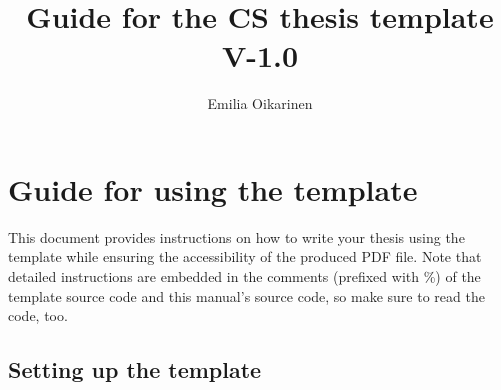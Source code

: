 \documentclass[english, manual, a4paper]{csthesis}
\begin{document}
\title{Guide for the CS thesis template V-1.0}
\author{Emilia Oikarinen}
\thispagestyle{empty}
\maketitle


\cleardoublepage
{}
\tableofcontents
\cleardoublepage
{}

\chapter{Guide for using the template}
\label{appendix:instructions_english}

This document provides instructions on how to write your thesis using the template while ensuring the accessibility of the produced PDF file. Note that detailed instructions are embedded in the comments (prefixed with \%) of the template source code and this manual's source code, so make sure to read the code, too.

\section{Setting up the template}
\end{document}
